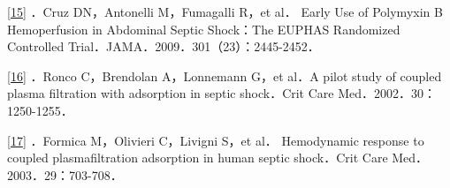\protect\hyperlink{text00018.htmlux5cux23ch15-17-back}{{[}15{]}} ．Cruz
DN，Antonelli M，Fumagalli R，et al． Early Use of Polymyxin B
Hemoperfusion in Abdominal Septic Shock：The EUPHAS Randomized
Controlled Trial．JAMA．2009．301（23）：2445-2452．

\protect\hyperlink{text00018.htmlux5cux23ch16-17-back}{{[}16{]}} ．Ronco
C，Brendolan A，Lonnemann G，et al．A pilot study of coupled plasma
filtration with adsorption in septic shock．Crit Care
Med．2002．30：1250-1255．

\protect\hyperlink{text00018.htmlux5cux23ch17-17-back}{{[}17{]}}
．Formica M，Olivieri C，Livigni S，et al． Hemodynamic response to
coupled plasmafiltration adsorption in human septic shock．Crit Care
Med．2003．29：703-708．

\protect\hypertarget{text00019.html}{}{}

